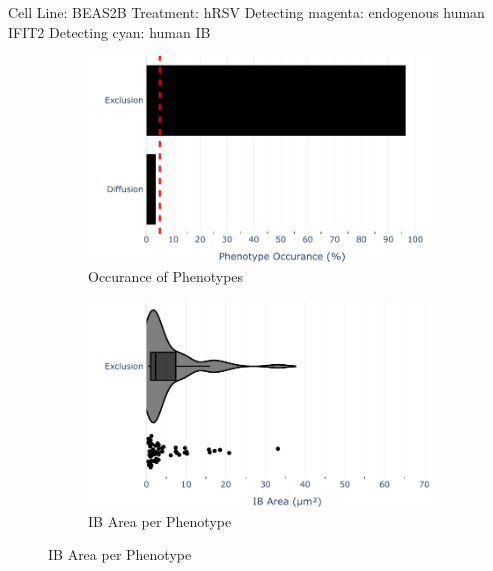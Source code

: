 Cell Line: BEAS2B \newline
Treatment: hRSV \newline
Detecting magenta: endogenous human IFIT2  \newline
Detecting cyan: human IB \newline

\begin{figure}
    \begin{subfigure}{0.5\textwidth}
    \includegraphics[width=1\linewidth]{10. Chapter 5/Figs/01. Infection/02. IFIT2B/01. bar_i2b_a549-n.pdf} 
    \caption[]{Occurance of Phenotypes}
    \end{subfigure}
    \begin{subfigure}{0.5\textwidth}
    \includegraphics[width=1\linewidth]{10. Chapter 5/Figs/01. Infection/02. IFIT2B/02. violin_i2b_a549-n.pdf}
    \caption[]{IB Area per Phenotype}
    \end{subfigure}


\end{figure}
